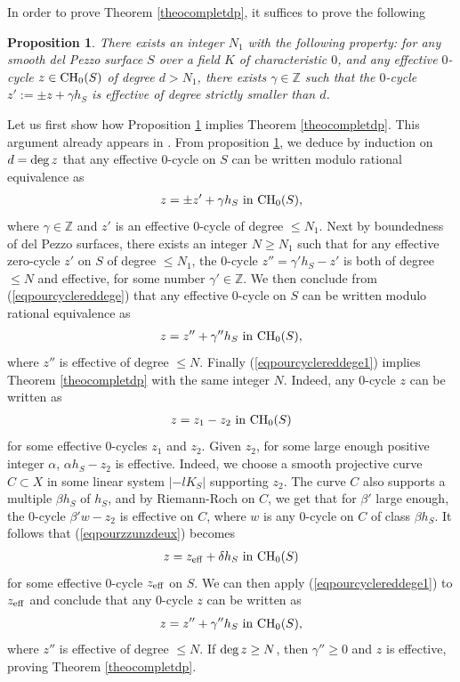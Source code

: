 \documentclass[10pt]{article}
\newtheorem{prop}[theo]{Proposition}
\begin{document}
In order to prove Theorem \ref{theocompletdp}, it suffices to prove the following
\begin{prop} \label{propaprouver} There exists an integer $N_1$ with the following property: for any smooth del Pezzo surface $S$ over a field $K$ of characteristic $0$, and any   effective $0$-cycle $z\in{\rm CH}_0(S)$  of degree $d> N_1$, there exists  $\gamma \in\mathbb{Z}$ such that
 the  $0$-cycle $z':=\pm z+\gamma h_S$ is effective   of degree strictly smaller than $d$.
\end{prop}
Let us first  show how Proposition \ref{propaprouver} implies Theorem \ref{theocompletdp}. This argument already appears in \cite{voisindelpezzo}. From proposition \ref{propaprouver}, we deduce by induction on $d={\rm deg}\,z$ that any effective $0$-cycle on $S$ can be written modulo rational equivalence as
\begin{eqnarray}\label{eqpourcyclereddege} z=\pm z'+\gamma h_S\,\,{\rm in}\,\,{\rm CH}_0(S),\end{eqnarray}
where $\gamma\in \mathbb{Z}$ and $z'$ is an effective $0$-cycle of degree $\leq N_1$. Next by boundedness of del Pezzo surfaces, there exists an integer $N\geq N_1$ such that for any effective zero-cycle $z'$ on $S$ of degree $\leq N_1$, the  $0$-cycle $z''=\gamma' h_S-z'$ is both of degree $\leq N$ and  effective, for some number $\gamma'\in \mathbb{Z}$. We then conclude from (\ref{eqpourcyclereddege}) that any effective $0$-cycle on $S$ can be written modulo rational equivalence as
\begin{eqnarray}\label{eqpourcyclereddege1} z= z''+\gamma'' h_S\,\,{\rm in}\,\,{\rm CH}_0(S),\end{eqnarray}
where $z''$ is effective of degree $\leq N$.
Finally (\ref{eqpourcyclereddege1}) implies  Theorem \ref{theocompletdp} with the same integer $N$.
Indeed, any $0$-cycle $z$ can be written as \begin{eqnarray}\label{eqpourzzunzdeux} z=z_1-z_2\,\,{\rm  in}\,\, {\rm CH}_0(S)\end{eqnarray}  for some effective $0$-cycles $z_1$ and $z_2$. Given $z_2$, for some large enough  positive integer $\alpha$, $\alpha h_S-z_2$ is effective. Indeed, we choose a smooth projective  curve $C\subset X$ in some linear system $|-l K_S|$ supporting $z_2$. The curve $C$ also supports a multiple $\beta h_S$ of $h_S$, and by Riemann-Roch on $C$, we get that for $\beta'$ large enough, the $0$-cycle
$\beta'w-z_2$ is effective on $C$, where $w$ is any $0$-cycle on $C$ of class $\beta h_S$.
It follows that (\ref{eqpourzzunzdeux}) becomes
\begin{eqnarray}\label{eqpourzzunzdeux1} z=z_{\rm eff}+\delta h_S \,\,{\rm in}\,\,{\rm CH}_0(S)\end{eqnarray}
for some effective $0$-cycle $z_{\rm eff}$ on $S$. We can then apply (\ref{eqpourcyclereddege1}) to $z_{\rm eff}$ and conclude that any $0$-cycle $z$ can be written as
$$ z= z''+\gamma'' h_S\,\,{\rm in}\,\,{\rm CH}_0(S),$$
where $z''$ is effective of degree $\leq N$.
If ${\rm deg}\,z\geq N$, then $\gamma''\geq 0$ and $z$ is effective, proving Theorem \ref{theocompletdp}.
\end{document}
